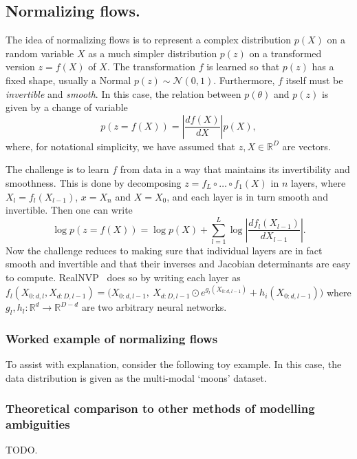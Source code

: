 \subsection{Normalizing flows.}


The idea of normalizing flows is to represent a complex distribution $p(X)$ on a random variable $X$ as a much simpler distribution $p(z)$ on a transformed version $z=f(X)$ of $X$.
The transformation $f$ is learned so that $p(z)$ has a fixed shape, usually a Normal $p(z) \sim \mathcal{N}(0,1)$.
Furthermore, $f$ itself must be \emph{invertible} and \emph{smooth}.
In this case, the relation between $p(\theta)$ and $p(z)$ is given by a change of variable
$$
 p(z = f(X)) =  \left| \frac{df(X)}{dX} \right| p(X),
$$
where, for notational simplicity, we have assumed that $z,X\in\mathbb{R}^D$ are vectors.

The challenge is to learn $f$ from data in a way that maintains its invertibility and smoothness.
This is done by decomposing $z = f_L \circ \dots \circ f_1 (X)$ in $n$ layers, where $X_l = f_l(X_{l-1})$, $x = X_n$ and $X=X_0$, and each layer is in turn smooth and invertible.
Then one can write
$$
 \log p(z = f(X)) =
 \log p(X) + \sum_{l=1}^L \log \left| \frac{df_l(X_{l-1})}{dX_{l-1}} \right|.
$$
Now the challenge reduces to making sure that individual layers are in fact smooth and invertible and that their inverses and Jacobian determinants are easy to compute.
RealNVP~\cite{dinh17density} does so by writing each layer as $f_l(X_{0:d,l}, X_{d:D,l-1}) = \big(X_{0:d,l-1},~ X_{d:D,l-1} \odot e^{g_l(X_{0:d,l-1})} + h_i(X_{0:d,l-1})\big)$ where $g_l,h_l:\mathbb{R}^d \rightarrow \mathbb{R}^{D-d}$ are two arbitrary neural networks.

\subsubsection{Worked example of normalizing flows}

To assist with explanation, consider the following toy example. In this case, the data distribution is given as the multi-modal `moons' dataset.


\subsubsection{Theoretical comparison to other methods of modelling ambiguities}
TODO.


